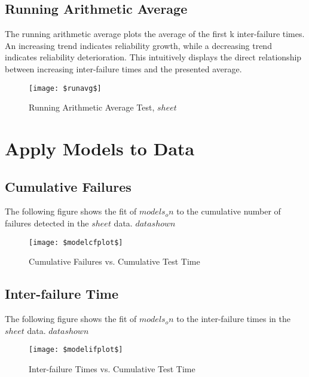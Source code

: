 \documentclass{article}
\begin{document}
\newpage
\subsection{Running Arithmetic Average}
The running arithmetic average plots the average of the first k inter-failure times. An increasing trend indicates reliability growth, while a decreasing trend indicates reliability deterioration. This intuitively displays the direct relationship between increasing inter-failure times and the presented average.



\begin{figure}[h!]
\centering
\texttt{[image: \$runavg\$]}
\caption{Running Arithmetic Average Test, $sheet$}
\label{fig:avgplot}
\end{figure}



\newpage



\section{Apply Models to Data}
\subsection{Cumulative Failures}
The following figure shows the fit of $models_on$ to the cumulative number of failures detected in the $sheet$ data. $datashown$



\begin{figure}[h!]
\centering
\texttt{[image: \$modelcfplot\$]}
\caption{Cumulative Failures vs. Cumulative Test Time}
\label{fig:mcfplot}
\end{figure}



\newpage

\subsection{Inter-failure Time}
The following figure shows the fit of $models_on$ to the inter-failure times in the $sheet$ data. $datashown$

\begin{figure}[h!]
\centering
\texttt{[image: \$modelifplot\$]}
\caption{Inter-failure Times vs. Cumulative Test Time}
\label{fig:mifplot}
\end{figure}
\end{document}
